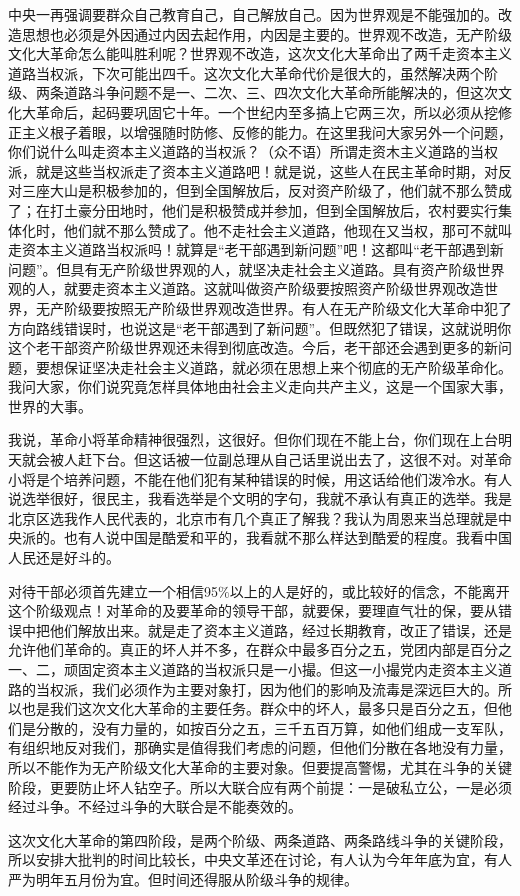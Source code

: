 中央一再强调要群众自己教育自己，自己解放自己。因为世界观是不能强加的。改造思想也必须是外因通过内因去起作用，内因是主要的。世界观不改造，无产阶级文化大革命怎么能叫胜利呢？世界观不改造，这次文化大革命出了两千走资本主义道路当权派，下次可能出四千。这次文化大革命代价是很大的，虽然解决两个阶级、两条道路斗争问题不是一、二次、三、四次文化大革命所能解决的，但这次文化大革命后，起码要巩固它十年。一个世纪内至多搞上它两三次，所以必须从挖修正主义根子着眼，以增强随时防修、反修的能力。在这里我问大家另外一个问题，你们说什么叫走资本主义道路的当权派？（众不语）所谓走资木主义道路的当权派，就是这些当权派走了资本主义道路吧！就是说，这些人在民主革命时期，对反对三座大山是积极参加的，但到全国解放后，反对资产阶级了，他们就不那么赞成了；在打土豪分田地时，他们是积极赞成并参加，但到全国解放后，农村要实行集体化时，他们就不那么赞成了。他不走社会主义道路，他现在又当权，那可不就叫走资本主义道路当权派吗！就算是“老干部遇到新问题”吧！这都叫“老干部遇到新问题”。但具有无产阶级世界观的人，就坚决走社会主义道路。具有资产阶级世界观的人，就要走资本主义道路。这就叫做资产阶级要按照资产阶级世界观改造世界，无产阶级要按照无产阶级世界观改造世界。有人在无产阶级文化大革命中犯了方向路线错误时，也说这是“老干部遇到了新问题”。但既然犯了错误，这就说明你这个老干部资产阶级世界观还未得到彻底改造。今后，老干部还会遇到更多的新问题，要想保证坚决走社会主义道路，就必须在思想上来个彻底的无产阶级革命化。我问大家，你们说究竟怎样具体地由社会主义走向共产主义，这是一个国家大事，世界的大事。

我说，革命小将革命精神很强烈，这很好。但你们现在不能上台，你们现在上台明天就会被人赶下台。但这话被一位副总理从自己话里说出去了，这很不对。对革命小将是个培养问题，不能在他们犯有某种错误的时候，用这话给他们泼冷水。有人说选举很好，很民主，我看选举是个文明的字句，我就不承认有真正的选举。我是北京区选我作人民代表的，北京市有几个真正了解我？我认为周恩来当总理就是中央派的。也有人说中国是酷爱和平的，我看就不那么样达到酷爱的程度。我看中国人民还是好斗的。

对待干部必须首先建立一个相信95$\%$以上的人是好的，或比较好的信念，不能离开这个阶级观点！对革命的及要革命的领导干部，就要保，要理直气壮的保，要从错误中把他们解放出来。就是走了资本主义道路，经过长期教育，改正了错误，还是允许他们革命的。真正的坏人并不多，在群众中最多百分之五，党团内部是百分之一、二，顽固定资本主义道路的当权派只是一小撮。但这一小撮党内走资本主义道路的当权派，我们必须作为主要对象打，因为他们的影响及流毒是深远巨大的。所以也是我们这次文化大革命的主要任务。群众中的坏人，最多只是百分之五，但他们是分散的，没有力量的，如按百分之五，三千五百万算，如他们组成一支军队，有组织地反对我们，那确实是值得我们考虑的问题，但他们分散在各地没有力量，所以不能作为无产阶级文化大革命的主要对象。但要提高警惕，尤其在斗争的关键阶段，更要防止坏人钻空子。所以大联合应有两个前提：一是破私立公，一是必须经过斗争。不经过斗争的大联合是不能奏效的。

这次文化大革命的第四阶段，是两个阶级、两条道路、两条路线斗争的关键阶段，所以安排大批判的时间比较长，中央文革还在讨论，有人认为今年年底为宜，有人严为明年五月份为宜。但时间还得服从阶级斗争的规律。

